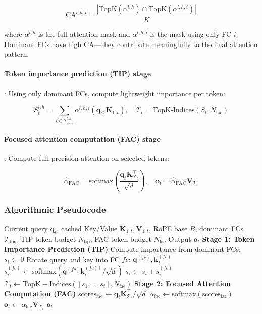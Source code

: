 \[
\text{CA}^{l,h,i} = \frac{|\text{TopK}(\alpha^{l,h}) \cap \text{TopK}(\alpha^{l,h,i})|}{K}
\]

where $\alpha^{l,h}$ is the full attention mask and $\alpha^{l,h,i}$ is the mask using only FC $i$. Dominant FCs have high CA---they contribute meaningfully to the final attention pattern.

\paragraph{Token importance prediction (TIP) stage}: Using only dominant FCs, compute lightweight importance per token:

\[
S_t^{l,h} = \sum_{i \in \mathcal{I}_{\text{dom}}^{l,h}} \alpha^{l,h,i}(\mathbf{q}_t, \mathbf{K}_{1:t}), \quad \mathcal{T}_t = \text{TopK-Indices}(S_t, N_{\text{fac}})
\]

\paragraph{Focused attention computation (FAC) stage}: Compute full-precision attention on selected tokens:

\[
\hat{\alpha}_{\text{FAC}} = \text{softmax}\left(\frac{\mathbf{q}_t \mathbf{K}_{\mathcal{T}_t}^\top}{\sqrt{d}}\right), \quad \mathbf{o}_t = \hat{\alpha}_{\text{FAC}} \mathbf{V}_{\mathcal{T}_t}
\]

\subsubsection{Algorithmic Pseudocode}

\begin{algorithm}[H]
\caption{FASA: Frequency-Aware Sparse Attention (Inference-Time)}
\begin{algorithmic}[1]
\Require Current query $\mathbf{q}_t$, cached Key/Value $\mathbf{K}_{1:t}, \mathbf{V}_{1:t}$, RoPE base $B$, dominant FCs $\mathcal{I}_{\text{dom}}$
\Require TIP token budget $N_{\text{tip}}$, FAC token budget $N_{\text{fac}}$
\Ensure Output $\mathbf{o}_t$
\State \textbf{Stage 1: Token Importance Prediction (TIP)}
        \State Compute importance from dominant FCs: $s_i \gets 0$
            \State Rotate query and key into FC $fc$: $\mathbf{q}^{(fc)}, \mathbf{k}_i^{(fc)}$
            \State $s_i^{(fc)} \gets \text{softmax}(\mathbf{q}^{(fc)} \mathbf{k}_i^{(fc)\top} / \sqrt{d}) $
            \State $s_i \gets s_i + s_i^{(fc)}$
        \EndFor
    \EndFor
    \State $\mathcal{T}_t \gets \mathrm{TopK-Indices}([s_1, \ldots, s_t], N_{\text{fac}})$ 
\EndFor
\State \textbf{Stage 2: Focused Attention Computation (FAC)}
\State $\text{scores}_{\text{fac}} \gets \mathbf{q}_t \mathbf{K}_{\mathcal{T}_t}^\top / \sqrt{d}$ 
\State $\alpha_{\text{fac}} \gets \text{softmax}(\text{scores}_{\text{fac}})$ 
\State $\mathbf{o}_t \gets \alpha_{\text{fac}} \mathbf{V}_{\mathcal{T}_t}$ 
\Return $\mathbf{o}_t$
\end{algorithmic}
\end{algorithm}

